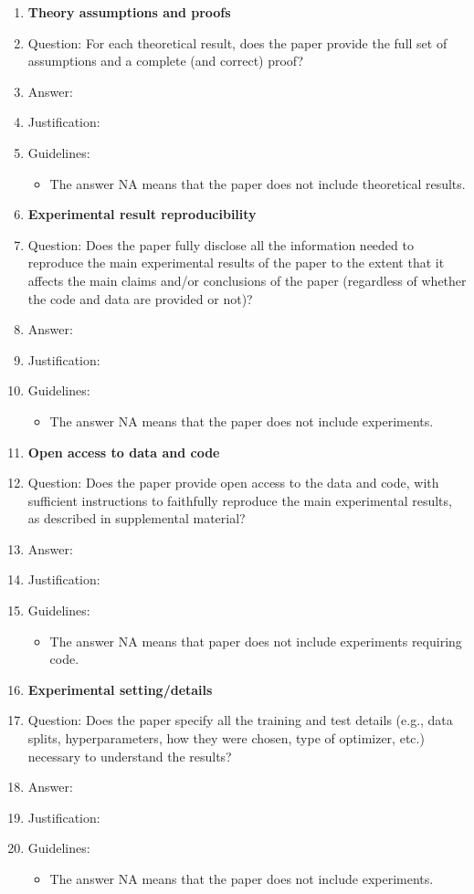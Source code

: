 \documentclass{article}
\begin{document}
\begin{enumerate}
\item {\bf Theory assumptions and proofs}
    \item[] Question: For each theoretical result, does the paper provide the full set of assumptions and a complete (and correct) proof?
    \item[] Answer: \answerTODO{}
    \item[] Justification: \justificationTODO{}
    \item[] Guidelines:
    \begin{itemize}
        \item The answer NA means that the paper does not include theoretical results.
    \end{itemize}

\item {\bf Experimental result reproducibility}
    \item[] Question: Does the paper fully disclose all the information needed to reproduce the main experimental results of the paper to the extent that it affects the main claims and/or conclusions of the paper (regardless of whether the code and data are provided or not)?
    \item[] Answer: \answerTODO{}
    \item[] Justification: \justificationTODO{}
    \item[] Guidelines:
    \begin{itemize}
        \item The answer NA means that the paper does not include experiments.
    \end{itemize}

\item {\bf Open access to data and code}
    \item[] Question: Does the paper provide open access to the data and code, with sufficient instructions to faithfully reproduce the main experimental results, as described in supplemental material?
    \item[] Answer: \answerTODO{}
    \item[] Justification: \justificationTODO{}
    \item[] Guidelines:
    \begin{itemize}
        \item The answer NA means that paper does not include experiments requiring code.
    \end{itemize}

\item {\bf Experimental setting/details}
    \item[] Question: Does the paper specify all the training and test details (e.g., data splits, hyperparameters, how they were chosen, type of optimizer, etc.) necessary to understand the results?
    \item[] Answer: \answerTODO{}
    \item[] Justification: \justificationTODO{}
    \item[] Guidelines:
    \begin{itemize}
        \item The answer NA means that the paper does not include experiments.
    \end{itemize}


\end{enumerate}
\end{document}
